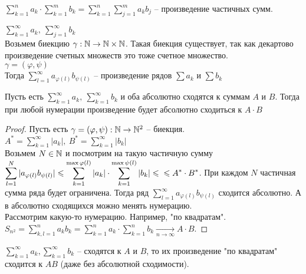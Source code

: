 \gdef\AuthorName{Ксения Кузьмина}


\begin{Def} 
	$\displaystyle \sum_{k=1}^{n} a_k \cdot \sum_{k=1}^{m} b_k = \sum_{k=1}^{n} \sum_{j=1}^{m} a_kb_j$ 
	-- произведение частичных сумм.  
\end{Def} 

\begin{Def} 
	$\displaystyle \sum_{k=1}^{\infty} a_k, \ \sum_{j=1}^{\infty} b_k$\\
	Возьмем биекцию $\gamma: \mathbb{N} \to \mathbb{N} \times \mathbb{N}$. Такая биекция существует, так как 
	декартово произведение счетных множеств это тоже счетное множество.\\
	$\gamma = (\varphi, \psi)$\\
	Тогда $\displaystyle \sum_{l=1}^{\infty} a_{\varphi(l)}b_{\psi (l)}$ -- произведение рядов
	$\sum a_k$ и $\sum b_k$
\end{Def} 

\begin{Thm} 
	Пусть есть $\sum_{k=1}^{\infty} a_k, \ \sum_{k=1}^{\infty} b_k$ и оба абсолютно сходятся к суммам 
	$A$ и $B$. Тогда при любой нумерации произведение будет абсолютно сходиться к $A \cdot B$ 
\end{Thm} 

\begin{proof}
	Пусть есть $\gamma = (\varphi, \psi): \mathbb{N} \to \mathbb{N}^2$ -- биекция.\\
	$A^* = \sum_{k=1}^{\infty} |a_k|, \ B^* = \sum_{k=1}^{\infty} |b_k|$\\
	Возьмем $N \in \mathbb{N}$ и посмотрим на такую частичную сумму $\displaystyle \sum_{l=1}^{N} |a_{\varphi (l)} b_{\psi (l)}|
	\leqslant \sum_{k=1}^{\max \varphi (l)} |a_k| \cdot \sum_{k=1}^{\max \psi (l)}  |b_k| \leqslant\\
	\leqslant A^* \cdot B^*$. При каждом $N$ частичная сумма ряда будет ограничена. Тогда ряд $\sum_{l=1}^{\infty} 
	a_{\varphi (l)} b_{\psi (l)}$ сходится абсолютно. А в абсолютно сходящихся можно менять нумерацию.\\
	Рассмотрим какую-то нумерацию. Например, "по квадратам".\\
	$S_{n^2} = \sum_{k,l = 1}^{n} a_k b_k = \sum_{k=1}^{n} a_k \cdot \sum_{k=1}^{n} b_k 
	\underset{n \to \infty}{\to} A \cdot B$. 
\end{proof}

\begin{Rem}
	$\sum_{k=1}^{\infty} a_k, \sum_{k=1}^{\infty} b_k$ -- сходятся к $A$ и $B$, то их произведение 
	"по квадратам" сходится к $AB$ (даже без абсолютной сходимости). 
\end{Rem}

